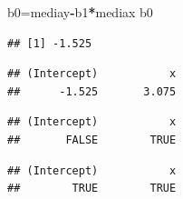\documentclass[
]{article}
\newenvironment{Shaded}{\begin{snugshade}}{\end{snugshade}}
\newcommand{\CommentTok}[1]{\textcolor[rgb]{0.56,0.35,0.01}{\textit{#1}}}
\newcommand{\KeywordTok}[1]{\textcolor[rgb]{0.13,0.29,0.53}{\textbf{#1}}}
\newcommand{\NormalTok}[1]{#1}
\newcommand{\OperatorTok}[1]{\textcolor[rgb]{0.81,0.36,0.00}{\textbf{#1}}}
\begin{document}
\begin{Shaded}
\begin{Highlighting}[]
\NormalTok{b0=mediay}\OperatorTok{{-}}\NormalTok{b1}\OperatorTok{*}\NormalTok{mediax}
\NormalTok{b0}
\end{Highlighting}
\end{Shaded}

\begin{verbatim}
## [1] -1.525
\end{verbatim}

\begin{Shaded}
\end{Shaded}

\begin{verbatim}
## (Intercept)           x 
##      -1.525       3.075
\end{verbatim}

\begin{Shaded}
\end{Shaded}

\begin{verbatim}
## (Intercept)           x 
##       FALSE        TRUE
\end{verbatim}

\begin{Shaded}
\end{Shaded}

\begin{verbatim}
## (Intercept)           x 
##        TRUE        TRUE
\end{verbatim}

\begin{Shaded}
\end{Shaded}
\end{document}
